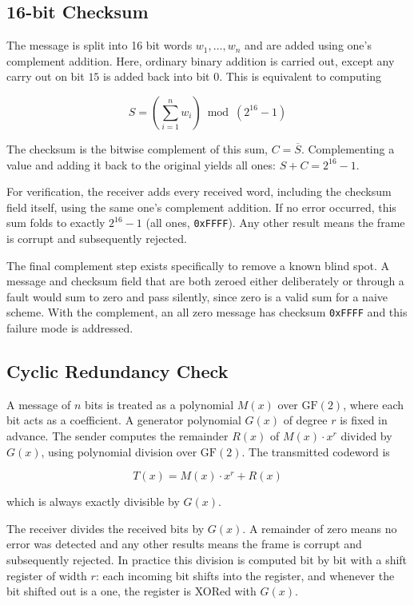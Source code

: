 \documentclass[10pt]{article}
\begin{document}
\subsection{16-bit Checksum}

The message is split into 16 bit words $w_1, \dots, w_n$ and 
are added using one's complement addition. Here, ordinary binary addition is carried out,
except any carry out on bit $15$ is added back into bit $0$. This is equivalent to computing

\[
S = \left(\sum_{i=1}^{n} w_i\right) \bmod (2^{16}-1)
\]

The checksum is the bitwise complement of this sum, $C = \overline{S}$.
Complementing a value and adding it back to the original 
yields all ones: $S + C = 2^{16}-1$.

For verification, the receiver adds every received word, including the
checksum field itself, using the same one's complement addition. If
no error occurred, this sum folds to exactly $2^{16}-1$ (all ones,
\texttt{0xFFFF}). Any other result means the frame is corrupt and subsequently rejected.

The final complement step exists specifically to remove a known blind
spot. A message and checksum field that are both zeroed either deliberately or through a fault would sum to zero and pass silently, since zero is a valid sum for a naive scheme. With the complement, an all zero
message has checksum \texttt{0xFFFF} and this failure mode is addressed.

\subsection{Cyclic Redundancy Check}

A message of $n$ bits is treated as a polynomial $M(x)$ over
$\mathrm{GF}(2)$, where each bit acts as a coefficient. A generator
polynomial $G(x)$ of degree $r$ is fixed in advance. The sender
computes the remainder $R(x)$ of $M(x) \cdot x^r$ divided by $G(x)$,
using polynomial division over $\mathrm{GF}(2)$. The transmitted codeword is

\[
T(x) = M(x)\cdot x^r + R(x)
\]

which is always exactly divisible by $G(x)$.

The receiver divides the received bits by $G(x)$. A remainder of zero means no error was detected and any other
results means the frame is corrupt and subsequently rejected. In practice this division is
computed bit by bit with a shift register of width $r$: each incoming
bit shifts into the register, and whenever the bit shifted out is a
one, the register is XORed with $G(x)$.
\end{document}
